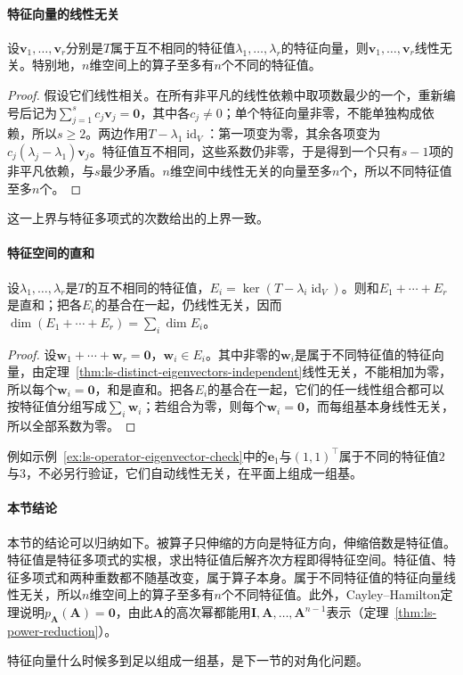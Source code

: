\paragraph{特征向量的线性无关}
\begin{theorem}[不同特征值的特征向量线性无关]
\label{thm:ls-distinct-eigenvectors-independent}
设$\bm v_1,\ldots,\bm v_r$分别是$T$属于互不相同的特征值$\lambda_1,\ldots,\lambda_r$的特征向量，则$\bm v_1,\ldots,\bm v_r$线性无关。特别地，$n$维空间上的算子至多有$n$个不同的特征值。
\end{theorem}
\begin{proof}
假设它们线性相关。在所有非平凡的线性依赖中取项数最少的一个，重新编号后记为$\sum_{j=1}^s c_j\bm v_j=\bm0$，其中各$c_j\neq0$；单个特征向量非零，不能单独构成依赖，所以$s\geq2$。两边作用$T-\lambda_1\operatorname{id}_V$：第一项变为零，其余各项变为$c_j(\lambda_j-\lambda_1)\bm v_j$。特征值互不相同，这些系数仍非零，于是得到一个只有$s-1$项的非平凡依赖，与$s$最少矛盾。$n$维空间中线性无关的向量至多$n$个，所以不同特征值至多$n$个。
\end{proof}
这一上界与特征多项式的次数给出的上界一致。

\paragraph{特征空间的直和}
\begin{theorem}[特征空间之和是直和]
\label{thm:ls-eigenspaces-direct-sum}
设$\lambda_1,\ldots,\lambda_r$是$T$的互不相同的特征值，$E_i=\ker(T-\lambda_i\operatorname{id}_V)$。则和$E_1+\cdots+E_r$是直和；把各$E_i$的基合在一起，仍线性无关，因而$\dim(E_1+\cdots+E_r)=\sum_i\dim E_i$。
\end{theorem}
\begin{proof}
设$\bm w_1+\cdots+\bm w_r=\bm0$，$\bm w_i\in E_i$。其中非零的$\bm w_i$是属于不同特征值的特征向量，由定理~\ref{thm:ls-distinct-eigenvectors-independent}线性无关，不能相加为零，所以每个$\bm w_i=\bm0$，和是直和。把各$E_i$的基合在一起，它们的任一线性组合都可以按特征值分组写成$\sum_i\bm w_i$；若组合为零，则每个$\bm w_i=\bm0$，而每组基本身线性无关，所以全部系数为零。
\end{proof}

例如示例~\ref{ex:ls-operator-eigenvector-check}中的$\bm e_1$与$(1,1)^{\top}$属于不同的特征值$2$与$3$，不必另行验证，它们自动线性无关，在平面上组成一组基。

\paragraph{本节结论}
本节的结论可以归纳如下。被算子只伸缩的方向是特征方向，伸缩倍数是特征值。特征值是特征多项式的实根，求出特征值后解齐次方程即得特征空间。特征值、特征多项式和两种重数都不随基改变，属于算子本身。属于不同特征值的特征向量线性无关，所以$n$维空间上的算子至多有$n$个不同特征值。此外，Cayley--Hamilton定理说明$p_{\bm A}(\bm A)=\bm0$，由此$\bm A$的高次幂都能用$\bm I,\bm A,\ldots,\bm A^{n-1}$表示（定理~\ref{thm:ls-power-reduction}）。

特征向量什么时候多到足以组成一组基，是下一节的对角化问题。
